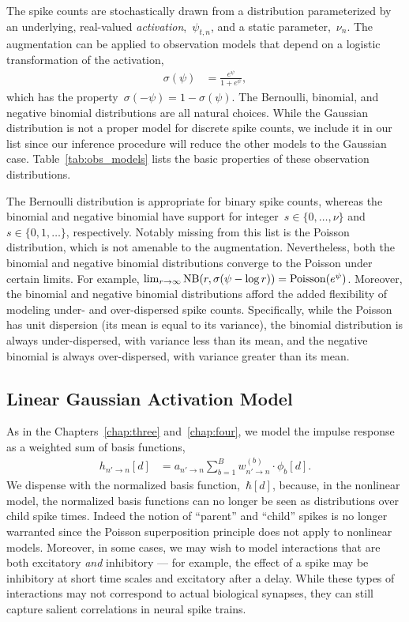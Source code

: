 The spike counts are stochastically drawn from a distribution
parameterized by an underlying, real-valued
\emph{activation},~$\psi_{t,n}$, and a static parameter,~$\nu_n$. 
The \polyagamma augmentation can be applied to observation models 
that depend on a logistic transformation of the activation,
\begin{align*}
  \sigma(\psi) &= \frac{e^\psi}{1+e^\psi},
\end{align*}
which has the property~$\sigma(-\psi) = 1-\sigma(\psi)$. The Bernoulli,
binomial, and negative binomial distributions are all natural choices.
While the Gaussian distribution is not a proper model for discrete
spike counts, we include it in our list since our inference procedure will 
reduce the other models to the Gaussian case. Table~\ref{tab:obs_models} 
lists the basic properties of these observation distributions.

The Bernoulli distribution is appropriate for binary spike counts,
whereas the binomial and negative binomial have support for
integer~$s\in \{0, \ldots, \nu\}$ and~$s \in \{0, 1, \ldots \}$,
respectively.  Notably missing from this list is the Poisson
distribution, which is not amenable to the \polyagamma
augmentation. Nevertheless, both the binomial and negative binomial
distributions converge to the Poisson under certain limits. For
example, $\lim_{r \to \infty} \mathrm{NB}(r, \sigma(\psi - \log
r)) = \mathrm{Poisson}(e^\psi)$. Moreover, the binomial and negative
binomial distributions afford the added flexibility of modeling under-
and over-dispersed spike counts. Specifically, while the Poisson has
unit dispersion (its mean is equal to its variance), the binomial
distribution is always under-dispersed, with variance less than its
mean, and the negative binomial is always over-dispersed, with
variance greater than its mean.

\subsection{Linear Gaussian Activation Model}
As in the Chapters~\ref{chap:three} and~\ref{chap:four}, we model the
impulse response as a weighted sum of basis functions,
\begin{align}
\label{eq:glm_impulse}
h_{n' \to n}[d] &= a_{n' \to n} \sum_{b=1}^B w_{n' \to n}^{(b)} \cdot \phi_b[d].
\end{align}
We dispense with the normalized basis function,~$\hbar[d]$,
because, in the nonlinear model, the normalized basis functions can no
longer be seen as distributions over child spike times. Indeed the
notion of ``parent'' and ``child'' spikes is no longer warranted since
the Poisson superposition principle does not apply to nonlinear
models.  Moreover, in some cases, we may wish to model interactions
that are both excitatory \emph{and} inhibitory --- for example, the
effect of a spike may be inhibitory at short time scales and
excitatory after a delay. While these types of interactions may not
correspond to actual biological synapses, they can still capture
salient correlations in neural spike trains.

